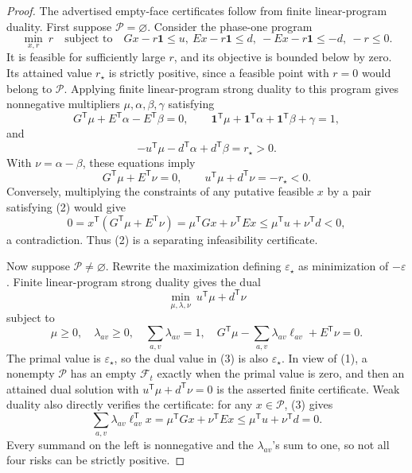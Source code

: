 \documentclass{article}
\begin{document}
\begin{proof}
The advertised empty-face certificates follow from finite linear-program duality.  First suppose \(\mathcal P=\varnothing\).  Consider the phase-one program
\[
 \min_{x,r}\ r
 \quad\text{subject to}\quad
 Gx-r\mathbf 1\leq u,
 \ Ex-r\mathbf 1\leq d,
 \ -Ex-r\mathbf 1\leq-d,
 \ -r\leq0.
\]
It is feasible for sufficiently large \(r\), and its objective is bounded below by zero.  Its attained value \(r_\star\) is strictly positive, since a feasible point with \(r=0\) would belong to \(\mathcal P\).  Applying finite linear-program strong duality to this program gives nonnegative multipliers \(\mu,\alpha,\beta,\gamma\) satisfying
\[
 G^{\mathsf T}\mu+E^{\mathsf T}\alpha-E^{\mathsf T}\beta=0,
 \qquad
 \mathbf 1^{\mathsf T}\mu+\mathbf 1^{\mathsf T}\alpha
 +\mathbf 1^{\mathsf T}\beta+\gamma=1,
\]
and
\[
 -u^{\mathsf T}\mu-d^{\mathsf T}\alpha+d^{\mathsf T}\beta=r_\star>0.
\]
With \(\nu=\alpha-\beta\), these equations imply
\[
 G^{\mathsf T}\mu+E^{\mathsf T}\nu=0,
 \qquad u^{\mathsf T}\mu+d^{\mathsf T}\nu=-r_\star<0.       \tag{2}
\]
Conversely, multiplying the constraints of any putative feasible \(x\) by a pair satisfying (2) would give
\[
 0=x^{\mathsf T}(G^{\mathsf T}\mu+E^{\mathsf T}\nu)
   =\mu^{\mathsf T}Gx+\nu^{\mathsf T}Ex
   \leq\mu^{\mathsf T}u+\nu^{\mathsf T}d<0,
\]
a contradiction.  Thus (2) is a separating infeasibility certificate.

Now suppose \(\mathcal P\neq\varnothing\).  Rewrite the maximization defining \(\varepsilon_\star\) as minimization of \(-\varepsilon\).  Finite linear-program strong duality gives the dual
\[
 \min_{\mu,\lambda,\nu}\ u^{\mathsf T}\mu+d^{\mathsf T}\nu
\]
subject to
\[
 \mu\geq0,\quad\lambda_{av}\geq0,\quad
 \sum_{a,v}\lambda_{av}=1,\quad
 G^{\mathsf T}\mu-\sum_{a,v}\lambda_{av}\ell_{av}
       +E^{\mathsf T}\nu=0.                                \tag{3}
\]
The primal value is \(\varepsilon_\star\), so the dual value in (3) is also \(\varepsilon_\star\).  In view of (1), a nonempty \(\mathcal P\) has an empty \(\mathcal F_t\) exactly when the primal value is zero, and then an attained dual solution with
\(u^{\mathsf T}\mu+d^{\mathsf T}\nu=0\) is the asserted finite certificate.  Weak duality also directly verifies the certificate: for any \(x\in\mathcal P\), (3) gives
\[
 \sum_{a,v}\lambda_{av}\ell_{av}^{\mathsf T}x
 =\mu^{\mathsf T}Gx+\nu^{\mathsf T}Ex
 \leq\mu^{\mathsf T}u+\nu^{\mathsf T}d=0.
\]
Every summand on the left is nonnegative and the \(\lambda_{av}\)'s sum to one, so not all four risks can be strictly positive.


\end{proof}
\end{document}
